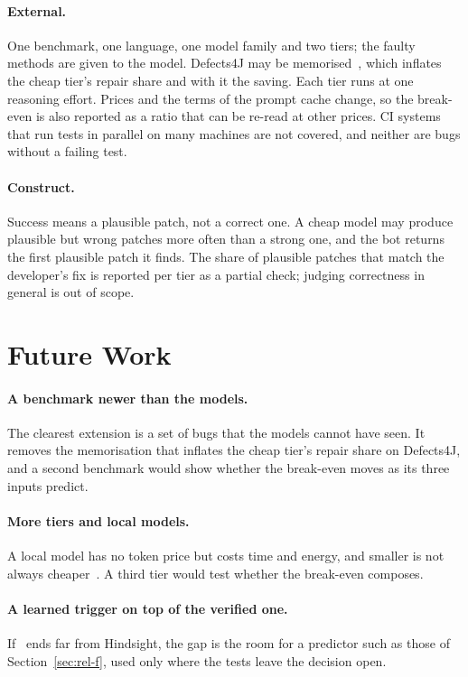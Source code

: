 \paragraph{External.} One benchmark, one language, one model family and two
tiers; the faulty methods are given to the model. Defects4J may be
memorised~\citep{ramos2024memorizing}, which inflates the cheap tier's repair
share and with it the saving. Each tier runs at one reasoning effort. Prices
and the terms of the prompt cache change, so the break-even is also reported
as a ratio that can be re-read at other prices. CI systems that run
tests in parallel on many machines are not covered, and neither are bugs
without a failing test.

\paragraph{Construct.} Success means a plausible patch, not a correct one. A
cheap model may produce plausible but wrong patches more often than a strong
one, and the bot returns the first plausible patch it finds. The share of
plausible patches that match the developer's fix is reported per tier as a
partial check; judging correctness in general is out of scope.

\section{Future Work}
\label{sec:plan-future}

\paragraph{A benchmark newer than the models.} The clearest extension is a set
of bugs that the models cannot have seen. It removes the memorisation that
inflates the cheap tier's repair share on Defects4J, and a second benchmark
would show whether the break-even moves as its three inputs predict.

\paragraph{More tiers and local models.} A local model has no token price but
costs time and energy, and smaller is not always
cheaper~\citep{vallecillos2026quantization}. A third tier would test whether
the break-even composes.

\paragraph{A learned trigger on top of the verified one.} If \Step\ ends far
from Hindsight, the gap is the room for a predictor such as those of
Section~\ref{sec:rel-f}, used only where the tests leave the decision open.

